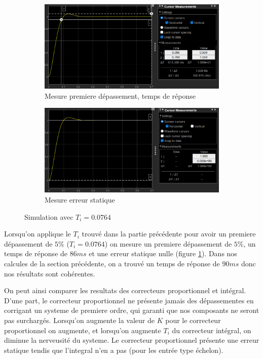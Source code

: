 \documentclass[12pt, a4paper]{report}
\begin{document}
\begin{figure}[H]
    \begin{subfigure}[h!]{0.4\linewidth}
        \includegraphics[width=\linewidth]{sim1123tr5prc1erdep.png}
        \caption{Mesure premiere dépassement, temps de réponse}
    \end{subfigure}
    \hfill
    \begin{subfigure}[h!]{0.4\linewidth}
        \includegraphics[width=\linewidth]{sim1123erreur.png}
        \caption{Mesure erreur statique}
    \end{subfigure}
    \caption{Simulation avec $T_i = 0.0764$}
    \label{fig:tipour5prc}
\end{figure}

Lorsqu'on applique le $T_i$ trouvé dans la partie précédente pour avoir un premiere dépassement de $5\%$
($T_i = 0.0764$) on mesure un premiere dépassement de $5\%$, un temps de réponse de $86ms$ et une erreur statique nulle (figure \ref{fig:tipour5prc}).
Dans nos calcules de la section précédente, on a trouvé un temps de réponse de $90ms$ donc nos résultats sont cohérentes.

On peut ainsi comparer les resultats des correcteurs proportionnel et intégral. D'une part, le correcteur
proportionnel ne présente jamais des dépassementes en corrigant un systeme de premiere ordre, qui garanti 
que nos composants ne seront pas surchargés. Lorsqu'on augmente la valeur de $K$ pour le correcteur proportionnel 
on augmente, et lorsqu'on augmente $T_i$ du correcteur intégral, on diminue la nerveusité du systeme. Le correcteur proportionnel présente
une erreur statique tendis que l'integral n'en a pas (pour les entrée type échelon). 
\end{document}

